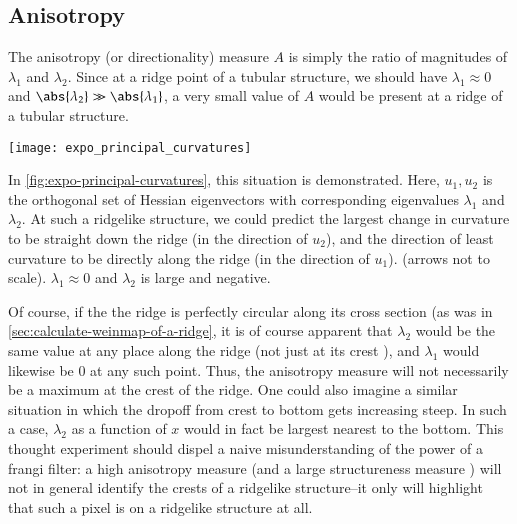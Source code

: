 \subsection{Anisotropy} \label{sec:frangi.anisotropy}
The anisotropy (or directionality) measure $A$ is simply the ratio of magnitudes of $\lambda_1$ and $\lambda_2$. Since at a ridge point of a tubular structure, we should have $\lambda_1 \approx 0$ and $\abs{\lambda_2} \gg \abs{\lambda_1}$,
a very small value of $A$ would be present at a ridge of a tubular structure.

\begin{thefigure}
\label{fig:expo-principal-curvatures}
\begin{center}
\texttt{[image: expo\_principal\_curvatures]}
\end{center}
\end{thefigure}

In \cref{fig:expo-principal-curvatures}, this situation is demonstrated. Here, $u_1, u_2$ is the orthogonal set of Hessian eigenvectors with corresponding eigenvalues $\lambda_1$ and $\lambda_2$. At such a ridgelike structure, we could predict the largest change in curvature to be straight down the ridge (in the direction of $u_2$), and the direction of least curvature to be directly along the ridge (in the direction  of $u_1$).
(arrows not to scale). $\lambda_1 \approx 0$ and $\lambda_2$ is large and negative.

Of course, if the the ridge is perfectly circular along its cross section (as was in \cref{sec:calculate-weinmap-of-a-ridge}, it is of course apparent that $\lambda_2$ would be the same value at any place along the ridge (not just at its crest ), and $\lambda_1$ would likewise be 0 at any such point. Thus, the anisotropy measure will not necessarily be a maximum at the crest of the ridge. One could also imagine a similar situation in which the dropoff from crest to bottom gets increasing steep. In such a case, $\lambda_2$ as a function of $x$ would in fact be largest nearest to the bottom. This thought experiment should dispel a naive misunderstanding of the power of a frangi filter: a high anisotropy measure (and a large structureness measure ) will not in general identify the crests of a ridgelike structure--it only will highlight that such a pixel is on a ridgelike structure at all.

